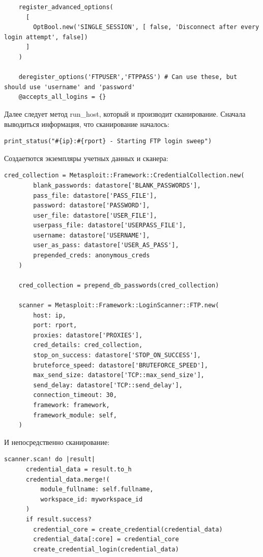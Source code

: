 \documentclass[11pt, a4paper]{article}		%
\begin{document}
\begin{itemize}
\begin{verbatim}
    register_advanced_options(
      [
        OptBool.new('SINGLE_SESSION', [ false, 'Disconnect after every login attempt', false])
      ]
    )

    deregister_options('FTPUSER','FTPPASS') # Can use these, but should use 'username' and 'password'
    @accepts_all_logins = {}
\end{verbatim}

Далее следует метод run\_host, который и производит сканирование. Сначала выводиться информация, что сканирование началось:

\begin{verbatim}
print_status("#{ip}:#{rport} - Starting FTP login sweep")
\end{verbatim}

Создаетются экземпляры учетных данных и сканера:

\begin{verbatim}
cred_collection = Metasploit::Framework::CredentialCollection.new(
        blank_passwords: datastore['BLANK_PASSWORDS'],
        pass_file: datastore['PASS_FILE'],
        password: datastore['PASSWORD'],
        user_file: datastore['USER_FILE'],
        userpass_file: datastore['USERPASS_FILE'],
        username: datastore['USERNAME'],
        user_as_pass: datastore['USER_AS_PASS'],
        prepended_creds: anonymous_creds
    )

    cred_collection = prepend_db_passwords(cred_collection)

    scanner = Metasploit::Framework::LoginScanner::FTP.new(
        host: ip,
        port: rport,
        proxies: datastore['PROXIES'],
        cred_details: cred_collection,
        stop_on_success: datastore['STOP_ON_SUCCESS'],
        bruteforce_speed: datastore['BRUTEFORCE_SPEED'],
        max_send_size: datastore['TCP::max_send_size'],
        send_delay: datastore['TCP::send_delay'],
        connection_timeout: 30,
        framework: framework,
        framework_module: self,
    )
\end{verbatim}

И непосредственно сканирование:

\begin{verbatim}
scanner.scan! do |result|
      credential_data = result.to_h
      credential_data.merge!(
          module_fullname: self.fullname,
          workspace_id: myworkspace_id
      )
      if result.success?
        credential_core = create_credential(credential_data)
        credential_data[:core] = credential_core
        create_credential_login(credential_data)


\end{verbatim}
\end{itemize}
\end{document}
